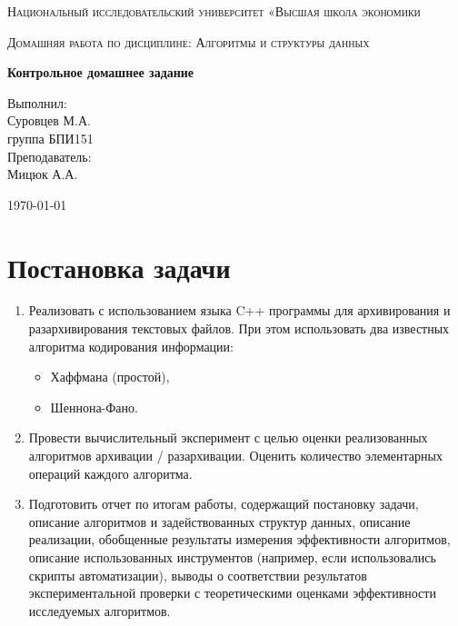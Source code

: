 \documentclass[a4paper,12pt]{article} %
\begin{document}
    \begin{titlepage}
        \centering
        {\scshape\LARGE Национальный исследовательский 
            университет «Высшая школа экономики \par}
        \vspace{1cm}
        {\scshape\Large Домашняя работа по дисциплине:
            Алгоритмы и структуры данных\par}
        \vspace{1.5cm}
        {\huge\bfseries Контрольное домашнее задание\par}
        \vspace{2cm}
        \raggedleft
        {\Large Выполнил:
            \\Суровцев М.А.
            \\группа БПИ151
            \vspace{0.5cm}
            \\Преподаватель: 
            \\Мицюк А.А.\par}
        \vfill
        \centering
        {\large \today\par}
    \end{titlepage}
    \tableofcontents
    \newpage
    
    \section{Постановка задачи}
    \begin{enumerate}
        \item
        Реализовать с использованием языка C++ программы для архивирования и
        разархивирования текстовых файлов. При этом использовать два известных 
        алгоритма кодирования информации:
        \begin{itemize}
            \item
            Хаффмана (простой),
            \item
            Шеннона-Фано.
        \end{itemize}
        \item
        Провести вычислительный эксперимент с целью оценки реализованных
        алгоритмов архивации / разархивации. Оценить количество элементарных операций
        каждого алгоритма.
        \item 
        Подготовить отчет по итогам работы, содержащий постановку задачи, описание
        алгоритмов и задействованных структур данных, описание реализации, обобщенные
        результаты измерения эффективности алгоритмов, описание использованных
        инструментов (например, если использовались скрипты автоматизации), выводы о
        соответствии результатов экспериментальной проверки с теоретическими оценками
        эффективности исследуемых алгоритмов.
    \end{enumerate}
    \newpage
    
\end{document}
